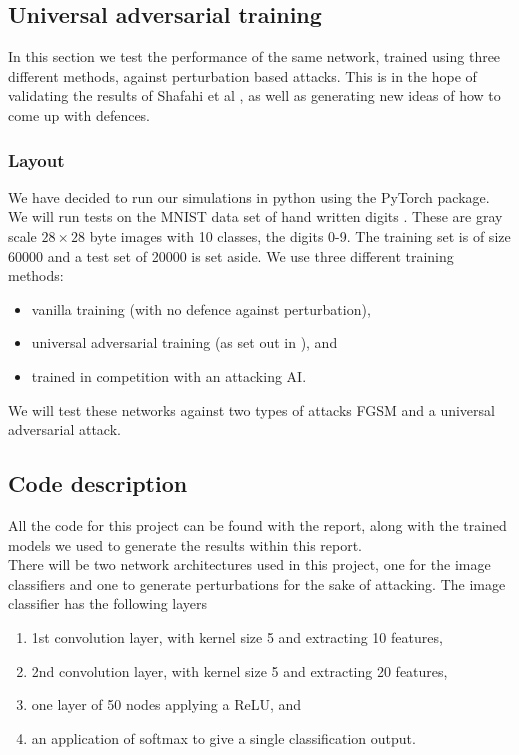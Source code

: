 \subsection{Universal adversarial training}

\setlength\parindent{0pt}

In this section we test the performance of the same network, trained using three different methods, against perturbation based attacks. This is in the hope of validating the results of Shafahi et al \cite{shafahi_universal_2018}, as well as generating new ideas of how to come up with defences.

\subsubsection{Layout}

We have decided to run our simulations in python using the PyTorch package. We will run tests on the MNIST data set of hand written digits \cite{lecun2010mnist}. These are gray scale $28 \times 28$ byte images with 10 classes, the digits 0-9. The training set is of size 60000 and a test set of 20000 is set aside. We use three different training methods:

\begin{itemize}
	\item vanilla training (with no defence against perturbation),
	\item universal adversarial training (as set out in \cite{shafahi_universal_2018}), and
	\item trained in competition with an attacking AI.
\end{itemize}

We will test these networks against two types of attacks FGSM and a universal adversarial attack.

\subsection{Code description}

All the code for this project can be found with the report, along with the trained models we used to generate the results within this report.\\ 

There will be two network architectures used in this project, one for the image classifiers and one to generate perturbations for the sake of attacking. The image classifier has the following layers

\begin{enumerate}
	\item 1st convolution layer, with kernel size 5 and extracting 10 features,
	\item 2nd convolution layer, with kernel size 5 and extracting 20 features,
	\item one layer of 50 nodes applying a ReLU, and
	\item an application of softmax to give a single classification output.
\end{enumerate}

